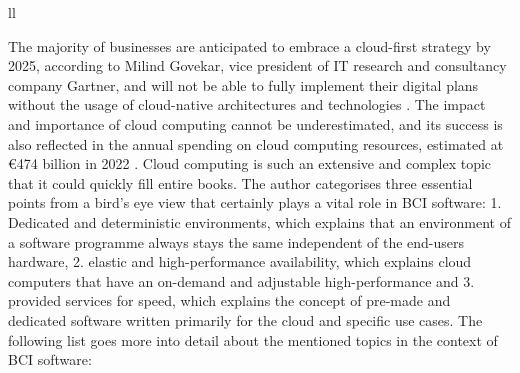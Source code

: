\begin{table}[!ht]
{\begin{tabular}{ll}
       \\ \hline
    \end{tabular}%
  }
  \vspace{10pt}
  \caption{The three abstraction levels and types of cloud computing \citep{amazon_web_services_inc_what_nodate}.}
  \vspace{-5pt}
  \label{tab:cloud-computing-types}
\end{table}

The majority of businesses are anticipated to embrace a cloud-first strategy by 2025, according to Milind Govekar, vice president of IT research and consultancy company Gartner, and will not be able to fully implement their digital plans without the usage of cloud-native architectures and technologies \citep{gartner_gartner_nodate}. The impact and importance of cloud computing cannot be underestimated, and its success is also reflected in the annual spending on cloud computing resources, estimated at €474 billion in 2022 \citep{gartner_gartner_nodate}. Cloud computing is such an extensive and complex topic that it could quickly fill entire books. The author categorises three essential points from a bird's eye view that certainly plays a vital role in BCI software: 1. Dedicated and deterministic environments, which explains that an environment of a software programme always stays the same independent of the end-users hardware, 2. elastic and high-performance availability, which explains cloud computers that have an on-demand and adjustable high-performance and 3. provided services for speed, which explains the concept of pre-made and dedicated software written primarily for the cloud and specific use cases. The following list goes more into detail about the mentioned topics in the context of BCI software:

